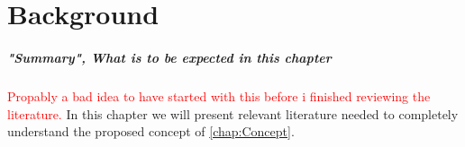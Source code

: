 \documentclass[main.tex]{subfiles}
\begin{document}
\chapter{Background}\label{chap:Background}
\paragraph*{"Summary", What is to be expected in this chapter}
\textcolor{red}{Propably a bad idea to have started with this before i finished reviewing the literature.}
In this chapter we will present relevant literature needed to completely understand the proposed concept of \autoref{chap:Concept}.
\end{document}
